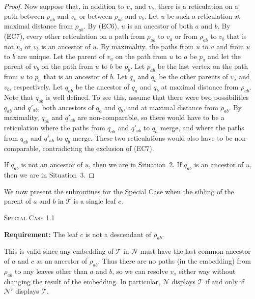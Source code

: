\documentclass[11pt]{amsart}
\begin{document}
\begin{proof}
Now suppose that, in addition to $v_a$ and $v_b$, there is a reticulation on a path between $\rho_{ab}$ and $v_a$ or between $\rho_{ab}$ and $v_b$. Let $u$ be such a reticulation at maximal distance from $\rho_{ab}$. By (EC6), $u$ is an ancestor of both $a$ and $b$. By (EC7), every other reticulation on a path from $\rho_{ab}$ to $v_a$ or from $\rho_{ab}$ to $v_b$ that is not $v_a$ or $v_b$ is an ancestor of $u$. By maximality, the paths from $u$ to $a$ and from $u$ to $b$ are unique. Let the parent of $v_a$ on the path from $u$ to $a$ be $p_a$ and let the parent of $v_b$ on the path from $u$ to $b$ be $p_b$. Let $p_{ab}$ be the last vertex on the path from $u$ to $p_a$ that is an ancestor of $b$. Let $q_a$ and $q_b$ be the other parents of $v_a$ and $v_b$, respectively. Let $q_{ab}$ be the ancestor of $q_a$ and $q_b$ at maximal distance from $\rho_{ab}$. Note that $q_{ab}$ is well defined. To see this, assume that there were two possibilities $q_{ab}$ and $q'_{ab}$, both ancestors of $q_a$ and $q_b$, and at maximal distance from $\rho_{ab}$. By maximality, $q_{ab}$ and $q'_{ab}$ are non-comparable, so there would have to be a reticulation where the paths from $q_{ab}$ and $q'_{ab}$ to $q_a$ merge, and where the paths from $q_{ab}$ and $q'_{ab}$ to $q_b$ merge. These two reticulations would also have to be non-comparable, contradicting the exclusion of (EC7).

If $q_{ab}$ is not an ancestor of $u$, then we are in Situation~2. If $q_{ab}$ is an ancestor of $u$, then we are in Situation~3.
\end{proof}

We now present the subroutines for the Special Case when the sibling of the parent of $a$ and $b$ in ${{\mathcal T}}$ is a single leaf $c$.

\begin{algorithm}[H]\label{SC:1}
 \caption{\textsc{Special Case 1.1}}
\begin{algorithmic}[1]
 \Statex\textbf{Requirement:} The leaf $c$ is not a descendant of $\rho_{ab}$.
 \end{algorithmic}
\end{algorithm}
This is valid since any embedding of ${{\mathcal T}}$ in ${{\mathcal N}}$ must have the last common ancestor of $a$ and $c$ as an ancestor of $\rho_{ab}$. Thus there are no paths (in the embedding) from $\rho_{ab}$ to any leaves other than $a$ and $b$, so we can resolve $v_a$ either way without changing the result of the embedding. In particular, ${{\mathcal N}}$ displays ${{\mathcal T}}$ if and only if ${{\mathcal N}}'$ displays ${{\mathcal T}}$.
\end{document}
